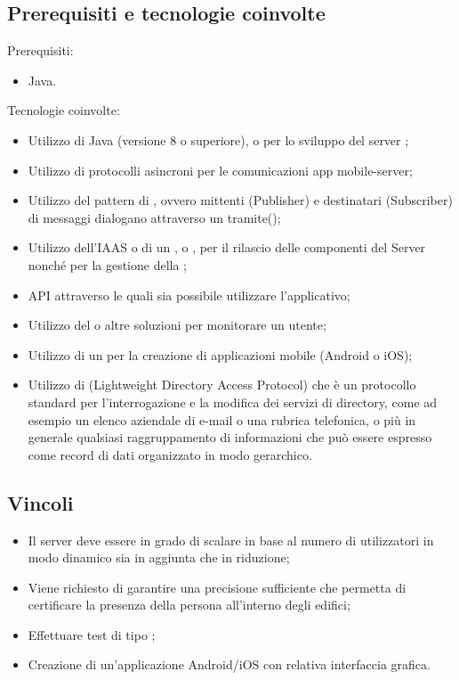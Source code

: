 \subsection{Prerequisiti e tecnologie coinvolte}
Prerequisiti:
\begin{itemize}
\item Java.
\end{itemize}
Tecnologie coinvolte:
\begin{itemize}
\item Utilizzo di Java (versione 8 o superiore),  o  per lo sviluppo del server ;
\item Utilizzo di protocolli asincroni per le comunicazioni app mobile-server;
\item Utilizzo del pattern di , ovvero mittenti (Publisher) e destinatari (Subscriber) di messaggi dialogano attraverso un tramite();
\item Utilizzo dell'IAAS  o di un ,  o , per il rilascio delle componenti del Server nonché per la gestione della ;
\item API  attraverso le quali sia possibile utilizzare l'applicativo;
\item Utilizzo del  o altre soluzioni per monitorare un utente;
\item Utilizzo di un  per la creazione di applicazioni mobile (Android o iOS);
\item Utilizzo di  (Lightweight Directory Access Protocol) che \`e un protocollo standard per l'interrogazione e la modifica dei servizi di directory, come ad esempio un elenco aziendale di e-mail o una rubrica telefonica, o più in generale qualsiasi raggruppamento di informazioni che può essere espresso come record di dati organizzato in modo gerarchico.
\end{itemize}

\subsection{Vincoli}
\begin{itemize}
\item Il server deve essere in grado di scalare in base al numero di utilizzatori in modo dinamico sia in aggiunta che in riduzione;
\item Viene richiesto di garantire una precisione sufficiente che permetta di certificare la presenza della persona all'interno degli edifici;
\item Effettuare test di tipo ;
\item Creazione di un'applicazione Android/iOS con relativa interfaccia grafica.
\end{itemize}

